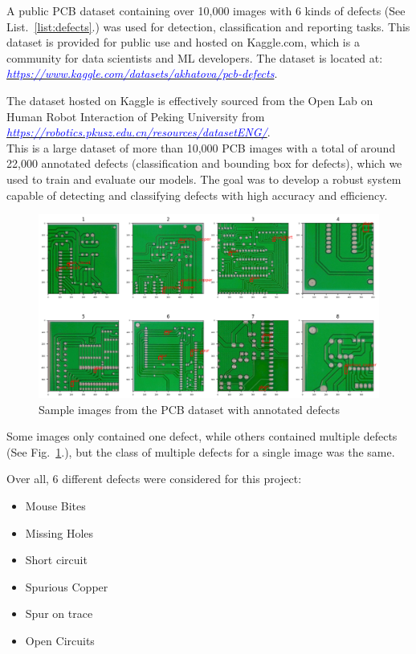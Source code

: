 \documentclass[12pt]{article}
\begin{document}
A public PCB dataset containing over 10,000 images with 6 kinds of defects (See List.~\ref{list:defects}.) was used for detection, classification and reporting tasks. This dataset is provided for public use and hosted on Kaggle.com, which is a community for data scientists and ML developers. The dataset is located at:\\ {\href{https://www.kaggle.com/datasets/akhatova/pcb-defects}{\textit{\textcolor{blue}{https://www.kaggle.com/datasets/akhatova/pcb-defects}}}}.

The dataset hosted on Kaggle is effectively sourced from the Open Lab on Human Robot Interaction of Peking University from\\
\href{https://robotics.pkusz.edu.cn/resources/datasetENG/}{\textit{\textcolor{blue}{https://robotics.pkusz.edu.cn/resources/datasetENG/}}}.\\
This is a large dataset of more than 10,000 PCB images with a total of around 22,000 annotated defects (classification and bounding box for defects), which we used to train and evaluate our models. The goal was to develop a robust system capable of detecting and classifying defects with high accuracy and efficiency.

\clearpage

\begin{figure}[h]
    \centering
    \includegraphics[width=1\textwidth]{./graphics/4.png}
    \caption{Sample images from the PCB dataset with annotated defects}
    \label{fig:sample_pcb_dataset}
\end{figure}

Some images only contained one defect, while others contained multiple defects (See Fig.~\ref{fig:sample_pcb_dataset}.), but the class of multiple defects for a single image was the same.

Over all, 6 different defects were considered for this project:
\begin{itemize}
    \item Mouse Bites
    \item Missing Holes
    \item Short circuit
    \item Spurious Copper
    \item Spur on trace
    \item Open Circuits
    \label{list:defects}
\end{itemize}
\end{document}
